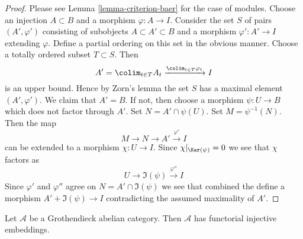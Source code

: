 \begin{proof}
Please see Lemma \ref{lemma-criterion-baer} for the case of modules.
Choose an injection $A \subset B$ and a morphism $\varphi : A \to I$.
Consider the set $S$ of pairs $(A', \varphi')$ consisting of
subobjects $A \subset A' \subset B$ and a morphism $\varphi' : A' \to I$
extending $\varphi$. Define a partial ordering on this set in the obvious
manner. Choose a totally ordered subset $T \subset S$. Then
$$
A' = \colim_{t \in T} A_t \xrightarrow{\colim_{t \in T} \varphi_t} I
$$
is an upper bound. Hence by Zorn's lemma the set $S$ has a maximal element
$(A', \varphi')$. We claim that $A' = B$. If not, then choose a morphism
$\psi : U \to B$ which does not factor through $A'$. Set
$N = A' \cap \psi(U)$. Set $M = \psi^{-1}(N)$. Then the map
$$
M \to N \to A' \xrightarrow{\varphi'} I
$$
can be extended to a morphism $\chi : U \to I$. Since
$\chi|_{\Ker(\psi)} = 0$ we see that $\chi$ factors as
$$
U \to \Im(\psi) \xrightarrow{\varphi''} I
$$
Since $\varphi'$ and $\varphi''$ agree on $N = A' \cap \Im(\psi)$
we see that combined the define a morphism $A' + \Im(\psi) \to I$
contradicting the assumed maximality of $A'$.
\end{proof}

\begin{theorem}
\label{theorem-injective-embedding-grothendieck}
Let $\mathcal{A}$ be a Grothendieck abelian category.
Then $\mathcal{A}$ has functorial injective embeddings.
\end{theorem}

